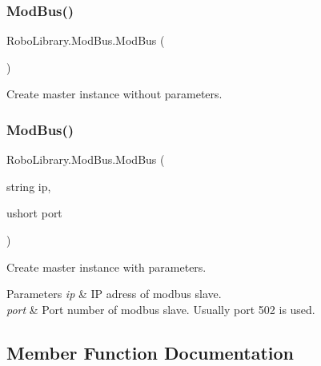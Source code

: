 \subsubsection{\texorpdfstring{Mod\+Bus()}{ModBus()}\hspace{0.1cm}{\footnotesize\ttfamily [1/2]}}
{\footnotesize\ttfamily Robo\+Library.\+Mod\+Bus.\+Mod\+Bus (\begin{DoxyParamCaption}{ }\end{DoxyParamCaption})}



Create master instance without parameters.

\hypertarget{class_robo_library_1_1_mod_bus_a9d7338590ea8f3a27978f7a8e6eebe92}{}\label{class_robo_library_1_1_mod_bus_a9d7338590ea8f3a27978f7a8e6eebe92} 
\subsubsection{\texorpdfstring{Mod\+Bus()}{ModBus()}\hspace{0.1cm}{\footnotesize\ttfamily [2/2]}}
{\footnotesize\ttfamily Robo\+Library.\+Mod\+Bus.\+Mod\+Bus (\begin{DoxyParamCaption}\item[{string}]{ip,  }\item[{ushort}]{port }\end{DoxyParamCaption})}



Create master instance with parameters.


\begin{DoxyParams}{Parameters}
{\em ip} & IP adress of modbus slave.\\
\hline
{\em port} & Port number of modbus slave. Usually port 502 is used.\\
\hline
\end{DoxyParams}


\subsection{Member Function Documentation}
\hypertarget{class_robo_library_1_1_mod_bus_ac84e8e0281a5b3089742e860cfdd25e5}{}\label{class_robo_library_1_1_mod_bus_ac84e8e0281a5b3089742e860cfdd25e5} 
